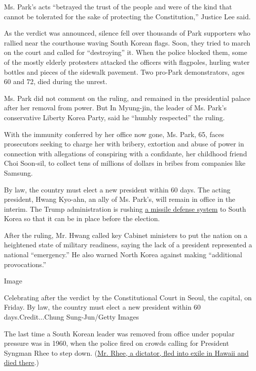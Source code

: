 Ms. Park's acts ``betrayed the trust of the people and were of the kind
that cannot be tolerated for the sake of protecting the Constitution,''
Justice Lee said.

As the verdict was announced, silence fell over thousands of Park
supporters who rallied near the courthouse waving South Korean flags.
Soon, they tried to march on the court and called for ``destroying'' it.
When the police blocked them, some of the mostly elderly protesters
attacked the officers with flagpoles, hurling water bottles and pieces
of the sidewalk pavement. Two pro-Park demonstrators, ages 60 and 72,
died during the unrest.

Ms. Park did not comment on the ruling, and remained in the presidential
palace after her removal from power. But In Myung-jin, the leader of Ms.
Park's conservative Liberty Korea Party, said he ``humbly respected''
the ruling.

With the immunity conferred by her office now gone, Ms. Park, 65, faces
prosecutors seeking to charge her with bribery, extortion and abuse of
power in connection with allegations of conspiring with a confidante,
her childhood friend Choi Soon-sil, to collect tens of millions of
dollars in bribes from companies like Samsung.

By law, the country must elect a new president within 60 days. The
acting president, Hwang Kyo-ahn, an ally of Ms. Park's, will remain in
office in the interim. The Trump administration is rushing
\href{https://www.nytimes.com/2017/03/07/world/asia/korea\%2Dmissile\%2Ddefense\%2Dchina\%2Dtrump.html?_r=0}{a
missile defense system} to South Korea so that it can be in place before
the election.

After the ruling, Mr. Hwang called key Cabinet ministers to put the
nation on a heightened state of military readiness, saying the lack of a
president represented a national ``emergency.'' He also warned North
Korea against making ``additional provocations.''

Image

Celebrating after the verdict by the Constitutional Court in Seoul, the
capital, on Friday. By law, the country must elect a new president
within 60 days.Credit...Chung Sung-Jun/Getty Images

The last time a South Korean leader was removed from office under
popular pressure was in 1960, when the police fired on crowds calling
for President Syngman Rhee to step down.
(\href{https://timesmachine.nytimes.com/timesmachine/1965/07/20/96708697.html?pageNumber=1}{Mr.
Rhee, a dictator, fled into exile in Hawaii and died there}.)

